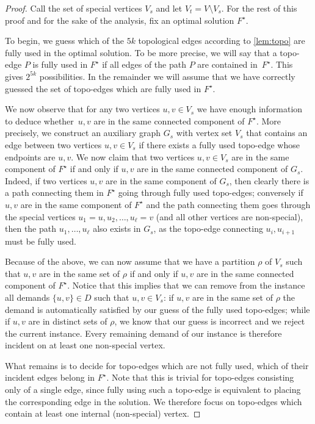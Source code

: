 \begin{proof}
%
%
Call the set of special vertices $V_s$ and let $V_t=V\setminus V_s$. For the rest of
this proof and for the sake of the analysis, fix an optimal solution $F^\star$.

To begin, we guess which of the $5k$ topological edges according to \cref{lem:topo} are fully used in the
optimal solution. To be more precise, we will say that a topo-edge $P$ is fully
used in $F^\star$ if all edges of the path $P$ are contained in~$F^\star$. This gives
$2^{5k}$ possibilities. In the remainder we will assume that we have correctly
guessed the set of topo-edges which are fully used in $F^\star$.

We now observe that for any two vertices $u,v\in V_s$ we have enough
information to deduce whether~$u,v$ are in the same connected component of
$F^\star$. More precisely, we construct an auxiliary graph $G_s$ with vertex
set $V_s$ that contains an edge between two vertices $u,v\in V_s$ if there
exists a fully used topo-edge whose endpoints are $u,v$.  We now claim that two
vertices $u,v\in V_s$ are in the same component of $F^\star$ if and only if
$u,v$ are in the same connected component of $G_s$. Indeed, if two vertices
$u,v$ are in the same component of $G_s$, then clearly there is a path
connecting them in $F^\star$ going through fully used topo-edges; conversely if
$u,v$ are in the same component of $F^\star$ and the path connecting them goes
through the special vertices $u_1=u, u_2,\ldots, u_\ell=v$ (and all other
vertices are non-special), then the path $u_1,\ldots, u_\ell$ also exists in
$G_s$, as the topo-edge connecting $u_i, u_{i+1}$ must be fully used.

Because of the above, we can now assume that we have a partition $\rho$ of $V_s$
such that $u,v$ are in the same set of $\rho$ if and only if $u,v$ are in the
same connected component of $F^\star$. Notice that this implies that we can remove
from the instance all demands $\{u,v\}\in D$ such that $u,v\in V_s$: if $u,v$ are in
the same set of $\rho$ the demand is automatically satisfied by our guess of the
fully used topo-edges; while if $u,v$ are in distinct sets of $\rho$, we know
that our guess is incorrect and we reject the current instance. Every remaining
demand of our instance is therefore incident on at least one non-special
vertex.


What remains is to decide for topo-edges which are not fully used, which of
their incident edges belong in $F^\star$. Note that this is trivial for topo-edges
consisting only of a single edge, since fully using such a topo-edge is
equivalent to placing the corresponding edge in the solution. We therefore
focus on topo-edges which contain at least one internal (non-special) vertex. 


\end{proof}
